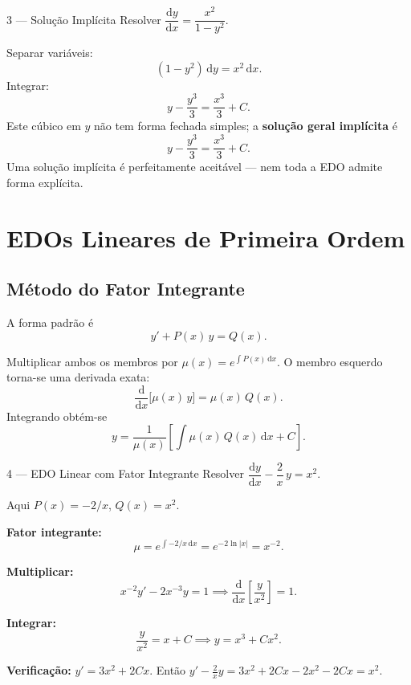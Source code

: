 \documentclass[12pt, a4paper]{article}
\newcommand{\dd}{\mathrm{d}}
\begin{document}
\begin{exbox}{3 --- Solução Implícita}
  Resolver $\dfrac{\dd y}{\dd x} = \dfrac{x^2}{1-y^2}$.
\end{exbox}

\begin{solbox}
  Separar variáveis:
  \[
    (1-y^2)\,\dd y = x^2\,\dd x.
  \]
  Integrar:
  \[
    y - \frac{y^3}{3} = \frac{x^3}{3} + C.
  \]
  Este cúbico em $y$ não tem forma fechada simples; a \textbf{solução geral implícita} é
  \[
    \boxed{y - \frac{y^3}{3} = \frac{x^3}{3} + C.}
  \]
  Uma solução implícita é perfeitamente aceitável --- nem toda a EDO admite forma explícita.
\end{solbox}

\section{EDOs Lineares de Primeira Ordem}
\label{sec:linear}

\subsection{Método do Fator Integrante}

A forma padrão é
\[
  y' + P(x)\,y = Q(x).
\]

\begin{thmbox}[title={Fator Integrante}]
  Multiplicar ambos os membros por $\mu(x) = e^{\int P(x)\,\dd x}$. O membro esquerdo
  torna-se uma derivada exata:
  \[
    \frac{\dd}{\dd x}\!\bigl[\mu(x)\,y\bigr] = \mu(x)\,Q(x).
  \]
  Integrando obtém-se
  \[
    y = \frac{1}{\mu(x)}\left[\int \mu(x)\,Q(x)\,\dd x + C\right].
  \]
\end{thmbox}

\begin{exbox}{4 --- EDO Linear com Fator Integrante}
  Resolver $\dfrac{\dd y}{\dd x} - \dfrac{2}{x}\,y = x^2$.
\end{exbox}

\begin{solbox}
  Aqui $P(x) = -2/x$, $Q(x)=x^2$.

  \textbf{Fator integrante:}
  \[
    \mu = e^{\int -2/x\,\dd x} = e^{-2\ln|x|} = x^{-2}.
  \]

  \textbf{Multiplicar:}
  \[
    x^{-2}y' - 2x^{-3}y = 1
    \implies \frac{\dd}{\dd x}\!\left[\frac{y}{x^2}\right] = 1.
  \]

  \textbf{Integrar:}
  \[
    \frac{y}{x^2} = x + C
    \implies \boxed{y = x^3 + Cx^2.}
  \]

  \textbf{Verificação:} $y'=3x^2+2Cx$. Então
  $y' - \tfrac{2}{x}y = 3x^2+2Cx - 2x^2 - 2Cx = x^2$. \checkmark
\end{solbox}
\end{document}
